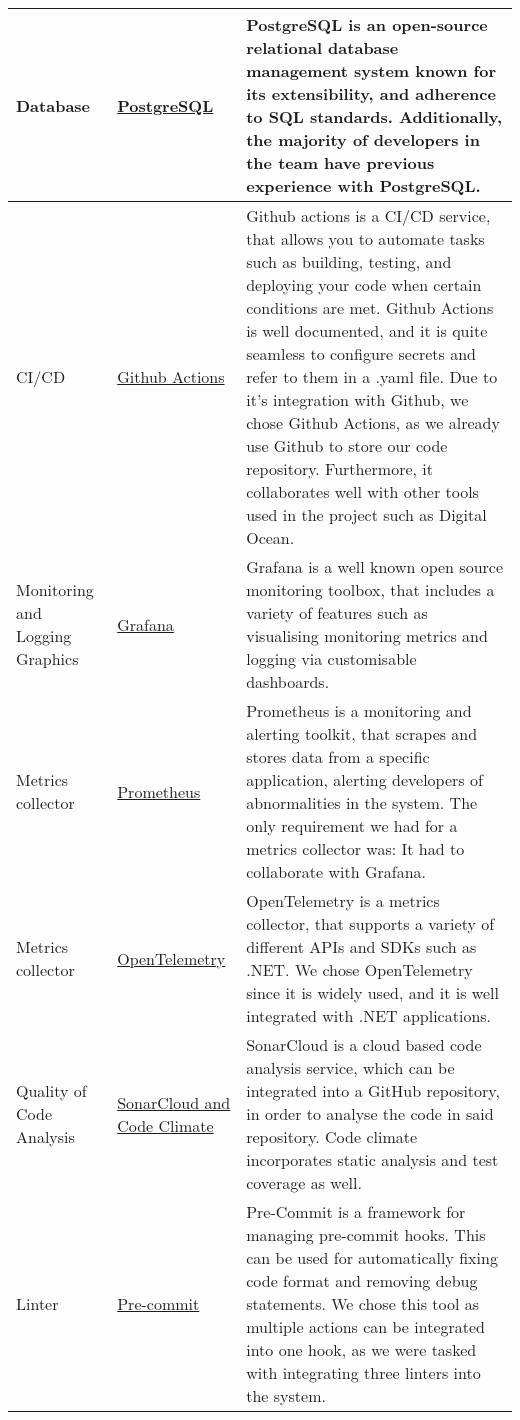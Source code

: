 \begin{longtable}{|p{}|p{} | p{}|}
    \hline
    Database & \href{https://www.postgresql.org/docs/}{PostgreSQL} & PostgreSQL is an open-source relational database management system known for its extensibility, and adherence to SQL standards. Additionally, the majority of developers in the team have previous experience with PostgreSQL.\\
    \hline
    CI/CD & \href{https://docs.github.com/en/actions}{Github Actions} & Github actions is a CI/CD service, that allows you to automate tasks such as building, testing, and deploying your code when certain conditions are met. Github Actions is well documented, and it is quite seamless to configure secrets and refer to them in a .yaml file. Due to it's integration with Github, we chose Github Actions, as we already use Github to store our code repository. Furthermore, it collaborates well with other tools used in the project such as Digital Ocean.\\
    \hline
    Monitoring and Logging Graphics & \href{https://grafana.com/}{Grafana} & Grafana is a well known open source monitoring toolbox, that includes a variety of features such as visualising monitoring metrics and logging via customisable dashboards.\\
    \hline
    Metrics collector & \href{https://prometheus.io/docs/}{Prometheus} & Prometheus is a monitoring and alerting toolkit, that scrapes and stores data from a specific application, alerting developers of abnormalities in the system. The only requirement we had for a metrics collector was: It had to collaborate with Grafana.\\
    \hline
    Metrics collector & \href{https://opentelemetry.io/docs/languages/}{OpenTelemetry} & OpenTelemetry is a metrics collector, that supports a variety of different APIs and SDKs such as .NET. We chose OpenTelemetry since it is widely used, and it is well integrated with .NET applications.\\
    \hline
    Quality of Code Analysis & \href{https://www.sonarsource.com/products/sonarcloud/}{SonarCloud and Code Climate} & SonarCloud is a cloud based code analysis service, which can be integrated into a GitHub repository, in order to analyse the code in said repository. Code climate incorporates static analysis and test coverage as well.\\
    \hline
    Linter & \href{https://pre-commit.com/}{Pre-commit} & Pre-Commit is a framework for managing pre-commit hooks. This can be used for automatically fixing code format and removing debug statements. We chose this tool as multiple actions can be integrated into one hook, as we were tasked with integrating three linters into the system.\\

\end{longtable}
